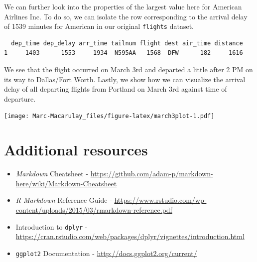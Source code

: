 \documentclass [11pt, proquest] {uwthesis}[2015/03/03]
\newenvironment{Shaded}{}{}
\newcommand{\KeywordTok}[1]{\textcolor[rgb]{0.00,0.44,0.13}{\textbf{{#1}}}}
\newcommand{\DataTypeTok}[1]{\textcolor[rgb]{0.56,0.13,0.00}{{#1}}}
\newcommand{\DecValTok}[1]{\textcolor[rgb]{0.25,0.63,0.44}{{#1}}}
\newcommand{\StringTok}[1]{\textcolor[rgb]{0.25,0.44,0.63}{{#1}}}
\newcommand{\NormalTok}[1]{{#1}}
\newcommand{\OperatorTok}[1]{\textcolor[rgb]{0.00,0.44,0.13}{\textbf{{#1}}}}
\begin{document}
We can further look into the properties of the largest value here for
American Airlines Inc. To do so, we can isolate the row corresponding to
the arrival delay of 1539 minutes for American in our original
\texttt{flights} dataset.
\begin{Shaded}
\end{Shaded}
\begin{verbatim}
  dep_time dep_delay arr_time tailnum flight dest air_time distance
1     1403      1553     1934  N595AA   1568  DFW      182     1616
\end{verbatim}
We see that the flight occurred on March 3rd and departed a little after
2 PM on its way to Dallas/Fort Worth. Lastly, we show how we can
visualize the arrival delay of all departing flights from Portland on
March 3rd against time of departure.
\begin{Shaded}
\end{Shaded}
\texttt{[image: Marc-Macarulay\_files/figure-latex/march3plot-1.pdf]}

\section{Additional resources}\label{additional-resources}
\begin{itemize}
\item
  \emph{Markdown} Cheatsheet -
  \url{https://github.com/adam-p/markdown-here/wiki/Markdown-Cheatsheet}
\item
  \emph{R Markdown} Reference Guide -
  \url{https://www.rstudio.com/wp-content/uploads/2015/03/rmarkdown-reference.pdf}
\item
  Introduction to \texttt{dplyr} -
  \url{https://cran.rstudio.com/web/packages/dplyr/vignettes/introduction.html}
\item
  \texttt{ggplot2} Documentation -
  \url{http://docs.ggplot2.org/current/}
\end{itemize}
\end{document}
